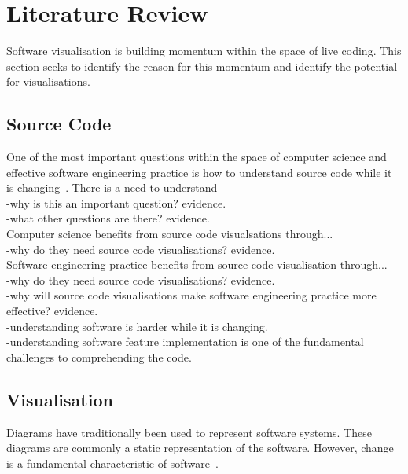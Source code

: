 
\chapter{Literature Review}
\label{cha:literaturereview}

Software visualisation is building momentum within the space of live coding. This section seeks to identify the reason for this momentum and identify the potential for visualisations.

\section{Source Code}

One of the most important questions within the space of computer science and effective software engineering practice is how to understand source code while it is changing~\cite{Tao2012}. There is a need to understand \\
-why is this an important question? evidence.\\
-what other questions are there? evidence.\\

Computer science benefits from source code visualsations through...\\
-why do they need source code visualisations? evidence.\\

Software engineering practice benefits from source code visualisation through...\\
-why do they need source code visualisations? evidence.\\
-why will source code visualisations make software engineering practice more effective? evidence.\\
-understanding software is harder while it is changing. \cite{Eisenbarth2003}\\
-understanding software feature implementation is one of the fundamental challenges to comprehending the code.\cite{Eisenbarth2003}\\


\section{Visualisation}

Diagrams have traditionally been used to represent software systems. These diagrams are commonly a static representation of the software. However, change is a fundamental characteristic of software~\cite{Purushothaman2005}.

